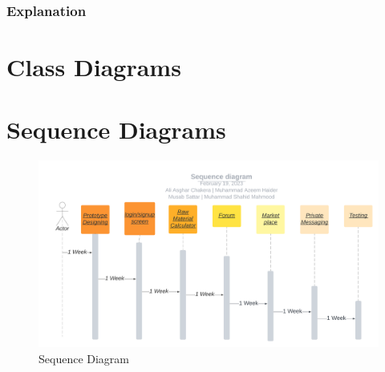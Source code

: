 \documentclass{article}
\begin{document}
\subsubsection*{Explanation}

\section*{Class Diagrams}

\section*{Sequence Diagrams}
\centering
\begin{figure}[!h]
    \includegraphics[width=1\linewidth]{Sequence diagram.png}
    \caption{Sequence Diagram}
    \label{fig:seq}
\end{figure}
\end{document}
